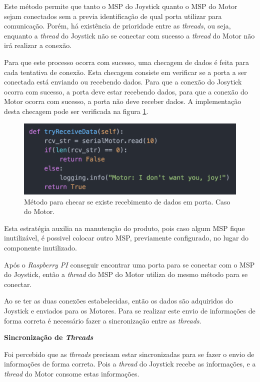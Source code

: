 		Este método permite que tanto o MSP do Joystick quanto o MSP do Motor sejam conectados sem a previa identificação de qual porta utilizar para comunicação. Porém, há existência de prioridade entre as \textit{threads}, ou seja, enquanto a \textit{thread} do Joystick não se conectar com sucesso a \textit{thread} do Motor não irá realizar a conexão.

		Para que este processo ocorra com sucesso, uma checagem de dados é feita para cada tentativa de conexão. Esta checagem consiste em verificar se a porta a ser conectada está enviando ou recebendo dados. Para que a conexão do Josytick ocorra com sucesso, a porta deve estar recebendo dados, para que a conexão do Motor ocorra com sucesso, a porta não deve receber dados. A implementação desta checagem pode ser verificada na figura \ref{fig:try_receive_data}.

		\begin{figure}[!htb]
			\centering
			\includegraphics[keepaspectratio=true,scale=0.5]{figuras/resultados/try_receive_data}
			\caption{Método para checar se existe recebimento de dados em porta. Caso do Motor.}
			\label{fig:try_receive_data}
		\end{figure}

		Esta estratégia auxilia na manutenção do produto, pois caso algum MSP fique inutilizável, é possivel colocar outro MSP, previamente configurado, no lugar do componente inutilizado.

		Após o \textit{Raspberry PI} conseguir encontrar uma porta para se conectar com o MSP do Joystick, então a \textit{thread} do MSP do Motor utiliza do mesmo método para se conectar.

		Ao se ter as duas conexões estabelecidas, então os dados são adquiridos do Joystick e enviados para os Motores. Para se realizar este envio de informações de forma correta é necessário fazer a sincronização entre as \textit{threads}.

		\textbf{Sincronização de \textit{Threads}}

		Foi percebido que as \textit{threads} precisam estar sincronizadas para se fazer o envio de informações de forma correta. Pois a \textit{thread} do Joystick recebe as informações, e a \textit{thread} do Motor consome estas informações.

